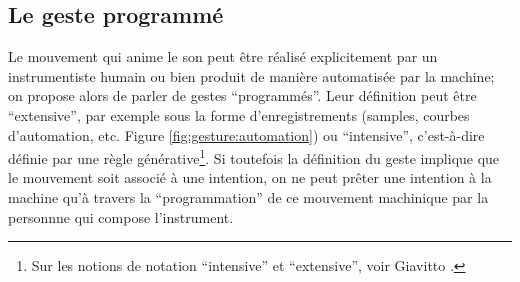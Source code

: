 \subsection{Le geste programmé}
\label{sec:gesture:instrumental_to_musical:geste_programme}

\noindent Le mouvement qui anime le son peut être réalisé explicitement par un instrumentiste humain ou bien produit de manière automatisée par la machine; on propose alors de parler de gestes ``programmés''. Leur définition peut être ``extensive'', par exemple sous la forme d'enregistrements (samples, courbes d'automation, etc. Figure \ref{fig:gesture:automation}) ou ``intensive'', c'est-à-dire définie par une règle générative\footnote{Sur les notions de notation ``intensive'' et ``extensive'', voir Giavitto \cite{giavitto_du_2014}.}. Si toutefois la définition du geste implique que le mouvement soit associé à une intention, on ne peut prêter une intention à la machine qu'à travers la ``programmation'' de ce mouvement machinique par la personnne qui compose l'instrument.\\
